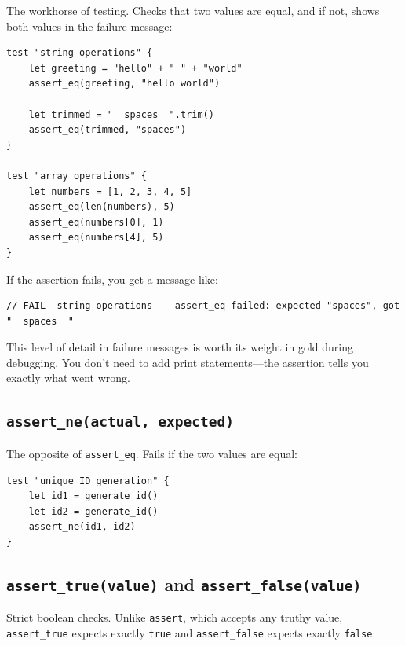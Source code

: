 The workhorse of testing.
Checks that two values are equal, and if not, shows both values in the failure message:

\begin{lstlisting}[language=Lattice, caption={assert\_eq with clear failure messages}]
test "string operations" {
    let greeting = "hello" + " " + "world"
    assert_eq(greeting, "hello world")

    let trimmed = "  spaces  ".trim()
    assert_eq(trimmed, "spaces")
}

test "array operations" {
    let numbers = [1, 2, 3, 4, 5]
    assert_eq(len(numbers), 5)
    assert_eq(numbers[0], 1)
    assert_eq(numbers[4], 5)
}
\end{lstlisting}

If the assertion fails, you get a message like:
\begin{lstlisting}[language=Lattice]
// FAIL  string operations -- assert_eq failed: expected "spaces", got "  spaces  "
\end{lstlisting}

This level of detail in failure messages is worth its weight in gold during debugging.
You don't need to add print statements---the assertion tells you exactly what went wrong.

\subsection{\texttt{assert\_ne(actual, expected)}}\label{sec:assert-ne}

The opposite of \lstinline|assert_eq|.
Fails if the two values are equal:

\begin{lstlisting}[language=Lattice, caption={Asserting inequality}]
test "unique ID generation" {
    let id1 = generate_id()
    let id2 = generate_id()
    assert_ne(id1, id2)
}
\end{lstlisting}

\subsection{\texttt{assert\_true(value)} and \texttt{assert\_false(value)}}\label{sec:assert-bool}

Strict boolean checks.
Unlike \lstinline|assert|, which accepts any truthy value, \lstinline|assert_true| expects exactly \lstinline|true| and \lstinline|assert_false| expects exactly \lstinline|false|:

